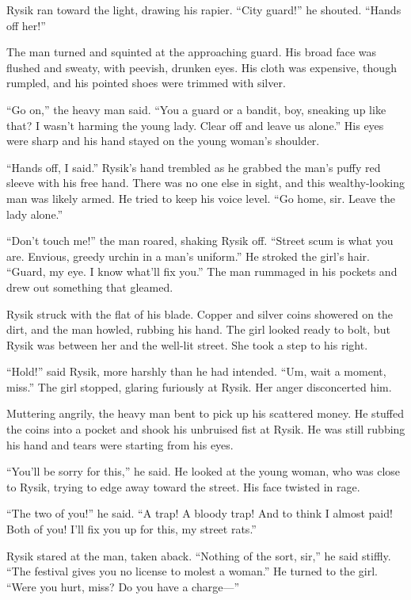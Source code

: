 \documentclass[10pt,a4paper]{article}
\begin{document}
Rysik ran toward the light, drawing his rapier. ``City guard!''
he shouted. ``Hands off her!''

The man turned and squinted at the approaching guard. His broad
face was flushed and sweaty, with peevish, drunken eyes. His cloth
was expensive, though rumpled, and his pointed shoes were trimmed
with silver.

``Go on,'' the heavy man said. ``You a guard or a bandit, boy, sneaking
up like that? I wasn't harming the young lady. Clear off and leave
us alone.'' His eyes were sharp and his hand stayed on the young
woman's shoulder.

``Hands off, I said.'' Rysik's hand trembled as he grabbed the man's
puffy red sleeve with his free hand. There was no one else in sight,
and this wealthy-looking man was likely armed. He tried to keep
his voice level. ``Go home, sir. Leave the lady alone.''

``Don't touch me!'' the man roared, shaking Rysik off. ``Street scum
is what you are. Envious, greedy urchin in a man's uniform.'' He
stroked the girl's hair. ``Guard, my eye. I know what'll fix you.''
The man rummaged in his pockets and drew out something that gleamed.

Rysik struck with the flat of his blade. Copper and silver coins
showered on the dirt, and the man howled, rubbing his hand. The girl
looked ready to bolt, but Rysik was between her and the well-lit
street. She took a step to his right.

``Hold!'' said Rysik, more harshly than he had intended. ``Um, wait
a moment, miss.'' The girl stopped, glaring furiously at Rysik. Her
anger disconcerted him.

Muttering angrily, the heavy man bent to pick up his scattered money.
He stuffed the coins into a pocket and shook his unbruised fist at
Rysik. He was still rubbing his hand and tears were starting from
his eyes.

``You'll be sorry for this,'' he said. He looked at the young woman,
who was close to Rysik, trying to edge away toward the street.
His face twisted in rage.

``The two of you!'' he said. ``A trap! A bloody trap! And to think I
almost paid! Both of you! I'll fix you up for this, my street rats.''

Rysik stared at the man, taken aback. ``Nothing of the sort, sir,'' he
said stiffly. ``The festival gives you no license to molest a woman.''
He turned to the girl. ``Were you hurt, miss? Do you have a charge---''
\end{document}

